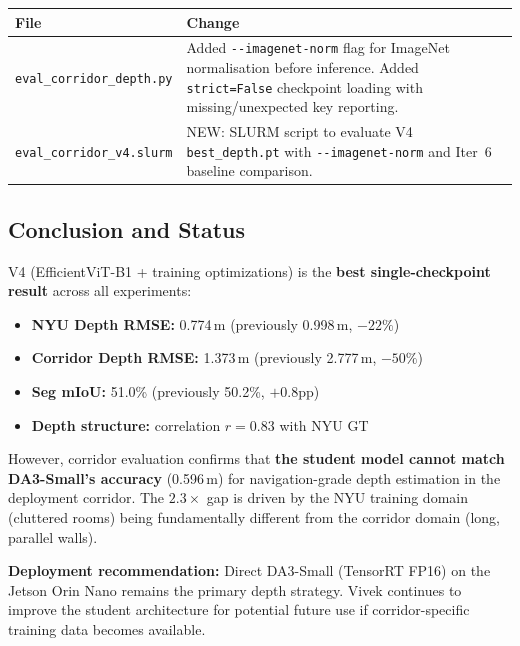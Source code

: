 \documentclass[11pt,a4paper]{article}
\begin{document}
\begin{longtable}{lp{8cm}}
\toprule
\textbf{File} & \textbf{Change} \\
\midrule
\texttt{eval\_corridor\_depth.py} & Added \texttt{-{}-imagenet-norm} flag for
  ImageNet normalisation before inference. Added \texttt{strict=False}
  checkpoint loading with missing/unexpected key reporting. \\
\texttt{eval\_corridor\_v4.slurm} & NEW: SLURM script to evaluate V4
  \texttt{best\_depth.pt} with \texttt{-{}-imagenet-norm} and Iter~6
  baseline comparison. \\
\bottomrule
\end{longtable}

\subsection{Conclusion and Status}
\label{sec:vivek-conclusion}

V4 (EfficientViT-B1 + training optimizations) is the \textbf{best single-checkpoint
result} across all experiments:

\begin{itemize}[nosep]
  \item \textbf{NYU Depth RMSE:} 0.774\,m (previously 0.998\,m, $-22\%$)
  \item \textbf{Corridor Depth RMSE:} 1.373\,m (previously 2.777\,m, $-50\%$)
  \item \textbf{Seg mIoU:} 51.0\% (previously 50.2\%, $+0.8$pp)
  \item \textbf{Depth structure:} correlation $r = 0.83$ with NYU GT
\end{itemize}

However, corridor evaluation confirms that \textbf{the student model cannot
match DA3-Small's accuracy} (0.596\,m) for navigation-grade depth estimation
in the deployment corridor. The $2.3\times$ gap is driven by the NYU
training domain (cluttered rooms) being fundamentally different from
the corridor domain (long, parallel walls).

\textbf{Deployment recommendation:} Direct DA3-Small (TensorRT FP16) on
the Jetson Orin Nano remains the primary depth strategy. Vivek continues
to improve the student architecture for potential future use if corridor-specific
training data becomes available.

\end{document}

